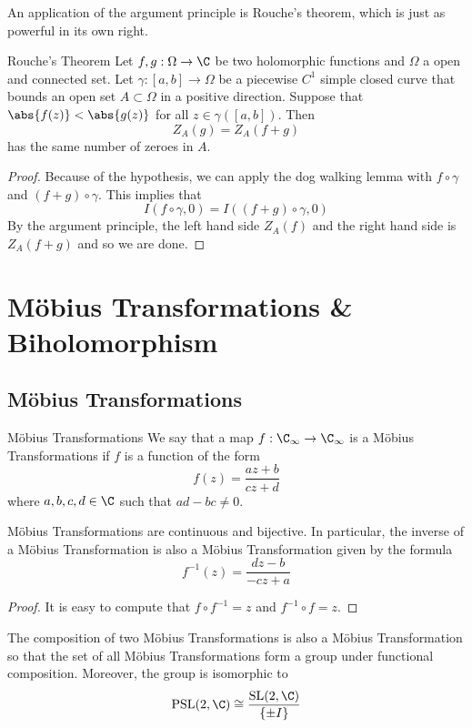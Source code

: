 \documentclass[a4paper]{article}
\begin{document}
An application of the argument principle is Rouche's theorem, which is just as powerful in its own right. 

\begin{thm}{Rouche's Theorem}{} Let $f,g:\Omega\to\C$ be two holomorphic functions and $\Omega$ a open and connected set. Let $\gamma:[a,b]\to\Omega$ be a piecewise $C^1$ simple closed curve that bounds an open set $A\subset\Omega$ in a positive direction. Suppose that $\abs{f(z)}<\abs{g(z)}$ for all $z\in\gamma([a,b])$. Then $$Z_A(g)=Z_A(f+g)$$ has the same number of zeroes in $A$. \tcbline
\begin{proof}
Because of the hypothesis, we can apply the dog walking lemma with $f\circ\gamma$ and $(f+g)\circ\gamma$. This implies that $$I(f\circ\gamma,0)=I\left((f+g)\circ\gamma,0\right)$$ By the argument principle, the left hand side $Z_A(f)$ and the right hand side is $Z_A(f+g)$ and so we are done. 
\end{proof}
\end{thm}

\pagebreak
\section{Möbius Transformations \& Biholomorphism}
\subsection{Möbius Transformations}
\begin{defn}{Möbius Transformations}{} We say that a map $f:\C_\infty\to\C_\infty$ is a Möbius Transformations if $f$ is a function of the form $$f(z)=\frac{az+b}{cz+d}$$ where $a,b,c,d\in\C$ such that $ad-bc\neq 0$. 
\end{defn}

\begin{prp}{}{} Möbius Transformations are continuous and bijective. In particular, the inverse of a Möbius Transformation is also a Möbius Transformation given by the formula $$f^{-1}(z)=\frac{dz-b}{-cz+a}$$ \tcbline
\begin{proof}
It is easy to compute that $f\circ f^{-1}=z$ and $f^{-1}\circ f=z$. 
\end{proof}
\end{prp}

\begin{prp}{}{} The composition of two Möbius Transformations is also a Möbius Transformation so that the set of all Möbius Transformations form a group under functional composition. Moreover, the group is isomorphic to $$\text{PSL}(2,\C)\cong\frac{\text{SL}(2,\C)}{\{\pm I\}}$$
\end{prp}
\end{document}
